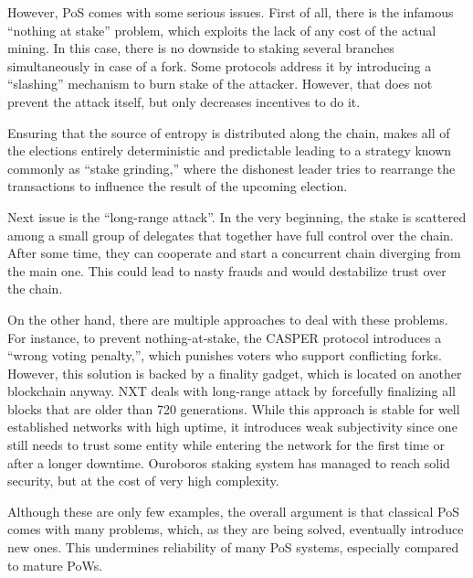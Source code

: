 However, PoS comes with some serious issues. First of all, there is the infamous
``nothing at stake''\cite{pos_flaws_nothing} problem, which exploits the lack of
any cost of the actual mining. In this case, there is no downside to staking
several branches simultaneously in case of a fork. Some protocols address it by
introducing a ``slashing'' mechanism to burn stake of the
attacker\cite{eth_slashing}. However, that does not prevent the attack itself,
but only decreases incentives to do it.

Ensuring that the source of entropy is distributed along the chain, makes all of
the elections entirely deterministic and predictable leading to a strategy known
commonly as ``stake grinding,'' where the dishonest leader tries to rearrange the
transactions to influence the result of the upcoming election.

Next issue is the ``long-range attack''\cite{pos_flaws_long}. In the very
beginning, the stake is scattered among a small group of delegates that together
have full control over the chain. After some time, they can cooperate and start
a concurrent chain diverging from the main one. This could lead to nasty frauds
and would destabilize trust over the chain.

On the other hand, there are multiple approaches to deal with these problems.
For instance, to prevent nothing-at-stake, the CASPER protocol introduces a
``wrong voting penalty,'', which punishes voters who support conflicting
forks\cite{casper}. However, this solution is backed by a finality gadget, which
is located on another blockchain anyway. NXT deals with long-range attack by
forcefully finalizing all blocks that are older than 720 generations\cite{nxt}.
While this approach is stable for well established networks with high uptime, it
introduces weak subjectivity since one still needs to trust some entity while
entering the network for the first time or after a longer downtime. Ouroboros
staking system has managed to reach solid security, but at the cost of very high
complexity\cite{ouroboros}.

Although these are only few examples, the overall argument is that classical PoS
comes with many problems, which, as they are being solved, eventually introduce
new ones. This undermines reliability of many PoS systems, especially compared
to mature PoWs.
